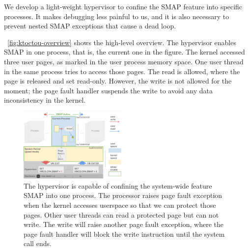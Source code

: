We develop a light-weight hypervisor to confine the SMAP feature into specific processes. It makes debugging less painful to us, and it is also necessary to prevent nested SMAP exceptions that cause a dead loop.

~\autoref{fig:ktoctou-overview} shows the high-level overview. The hypervisor enables SMAP in one process, that is, the current one in the figure. The kernel accessed three user pages, as marked in the user process memory space. One user thread in the same process tries to access those pages. The read is allowed, where the page is released and set read-only. However, the write is not allowed for the moment; the page fault handler suspends the write to avoid any data inconsistency in the kernel.


\begin{figure}[th]
  \includegraphics[width=0.47\textwidth]{figures/ktoctou-overview2}
  \centering
  \caption{The hypervisor is capable of confining the system-wide feature SMAP into one process. The processor raises page fault exception when the kernel accesses userspace so that we can protect those pages. Other user threads can read a protected page but can not write. The write will raise another page fault exception, where the page fault handler will block the write instruction until the system call ends.}
  \label{fig:ktoctou-overview}
\end{figure}
